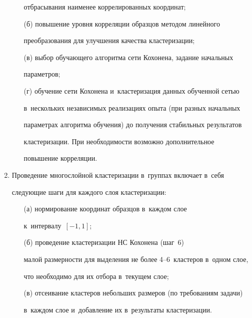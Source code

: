 \begin{enumerate}[1.]
\begin{itemize}
отбрасывания наименее коррелированных координат;\\[-15pt]


\item[(б)] повышение уровня корреляции образцов методом линейного 


преобразования для улучшения качества кластеризации;\\ [-15pt]


\item[(в)] выбор обучающего алгоритма сети Кохонена, задание начальных 


параметров;\\[-15pt] 


\item[(г)] обучение сети Кохонена и~кластеризация данных обученной сетью 


в~нескольких независимых реализациях опыта (при разных начальных 


параметрах алгоритма обучения) до получения стабильных результатов 


кластеризации. При необходимости возможно дополнительное 


повышение корреляции.


\end{itemize}


\item Проведение многослойной кластеризации в~группах включает в~себя 


следующие шаги для каждого слоя кластеризации:\\[-15pt]


\begin{itemize}


\item[(а)] нормирование координат образцов в~каждом слое  


к~интервалу~$[-1, 1]$;


\item[(б)] проведение кластеризации НС Кохонена (шаг~6) 


малой размерности для выделения не более 4--6~кластеров в~одном слое, 


что необходимо для их отбора в~текущем слое; 


\item[(в)] отсеивание кластеров небольших размеров (по требованиям задачи) 


в~каж\-дом слое и~добавление их в~результаты кластеризации.


\end{itemize}



\end{enumerate}

